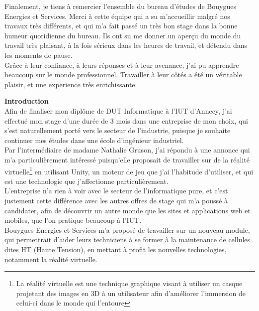 \documentclass[a4paper]{article}
\begin{document}
    Finalement, je tiens à remercier l'ensemble du bureau d'études de Bouygues Energies et Services. Merci à cette équipe qui a su m'accueillir malgré nos travaux très différents, et qui m'a fait passé un très bon stage dans la bonne humeur quotidienne du bureau. Ils ont su me donner un aperçu du monde du travail très plaisant, à la fois sérieux dans les heures de travail, et détendu dans les moments de pause. \vspace{10pt} \\

    Grâce à leur confiance, à leurs réponses et à leur avenance, j'ai pu apprendre beaucoup sur le monde professionnel. Travailler à leur côtés a été un véritable plaisir, et une experience très enrichissante. \\
    
    \newpage
    \setcounter{tocdepth}{2}
    \tableofcontents

    \newpage 
    \huge \textbf{Introduction} \vspace{20pt} \\
    \normalsize
    Afin de finaliser mon diplôme de DUT Informatique à l'IUT d'Annecy, j'ai effectué mon stage d'une durée de 3 mois dans une entreprise de mon choix, qui s'est naturellement porté vers le secteur de l'industrie, puisque je souhaite continuer mes études dans une école d'ingénieur industriel. \\

    Par l'intermédiaire de madame Nathalie Gruson, j'ai répondu à une annonce qui m'a particulièrement intéressé puisqu'elle proposait de travailler sur de la réalité virtuelle\footnote{La réalité virtuelle est une technique graphique visant à utiliser un casque projetant des images en 3D à un utilisateur afin d'améliorer l'immersion de celui-ci dans le monde qui l'entoure} en utilisant Unity, un moteur de jeu que j'ai l'habitude d'utiliser, et qui est une technologie que j'affectionne particulièrement. \\

    L'entreprise n'a rien à voir avec le secteur de l'informatique pure, et c'est justement cette différence avec les autres offres de stage qui m'a poussé à candidater, afin de découvrir un autre monde que les sites et applications web et mobiles, que l'on pratique beaucoup à l'IUT. \\
    
    Bouygues Energies et Services m'a proposé de travailler sur un nouveau module, qui permettrait d'aider leurs techniciens à se former à la maintenance de cellules dites HT (Haute Tension), en mettant à profit les nouvelles technologies, notamment la réalité virtuelle. \\
\end{document}
